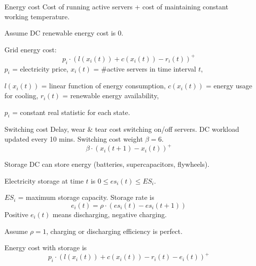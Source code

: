 \documentclass[xcolor=dvipsnames]{beamer}
\begin{document}
\begin{frame}{}
\begin{block}{Energy cost}
Cost of running active servers + cost of maintaining constant working temperature. 

Assume DC renewable energy cost is 0. 

Grid energy cost: \vspace{-3mm}
\begin{equation}
p_i \cdot (l(x_i(t)) + c(x_i(t)) - r_i(t))^+
\end{equation}
$p_i$ = electricity price, 
$x_i(t)$ = \#active servers in time interval $t$,

$l(x_i(t))$ = linear function of energy consumption, %
$c(x_i(t))$ = energy usage for cooling, $r_i(t)$ = renewable energy availability, 

$p_i$  = constant real statistic for each state. 
\end{block}

\begin{block}{Switching cost}
Delay, wear \& tear cost switching on/off servers. DC workload updated every 10 mins. Switching cost weight $\beta = 6$.
$$\beta \cdot (x_i(t+1) - x_i(t))^+$$
\end{block}

\end{frame}

\begin{frame}{}

\begin{block}{Storage}
DC can store energy (batteries, supercapacitors, flywheels).

Electricity storage at time $t$ is $0 \leq es_i(t) \leq ES_i$. 

$ES_i$ = maximum storage capacity.  Storage rate is
$$e_i(t) = \rho \cdot (es_i(t) - es_i(t+1))$$
Positive $e_i(t)$ means discharging, negative charging. 

Assume $\rho = 1$, charging or discharging efficiency is perfect.

Energy cost with storage is
\begin{equation}
p_i \cdot (l(x_i(t)) + c(x_i(t)) - r_i(t) - e_i(t))^+
\end{equation}
\end{block}
\end{frame}
\end{document}
